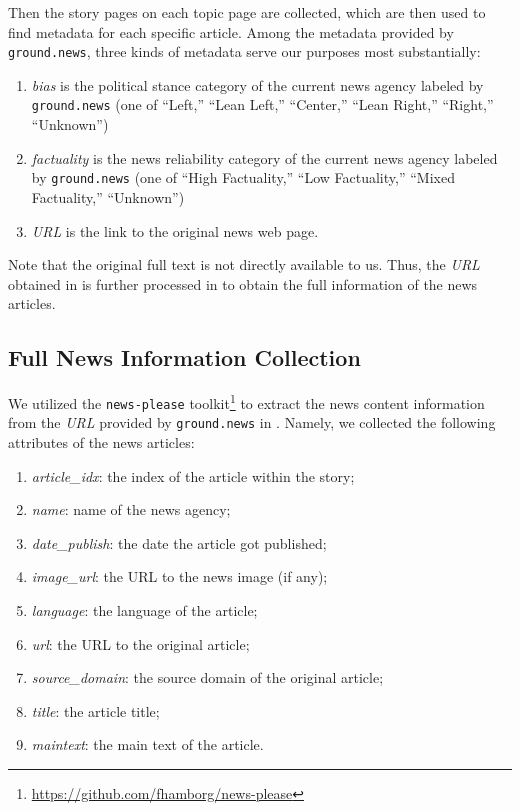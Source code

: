Then the story pages on each topic page are collected, which are then used to find metadata for each specific article. 
Among the metadata provided by \texttt{ground.news}, three kinds of metadata serve our purposes most substantially:
\begin{enumerate}
    \item \textit{bias} is the political stance category of the current news agency labeled by \texttt{ground.news} (one of ``Left,'' ``Lean Left,'' ``Center,'' ``Lean Right,'' ``Right,'' ``Unknown'')
    \item \textit{factuality} is the news reliability category of the current news agency labeled by \texttt{ground.news} (one of ``High Factuality,'' ``Low Factuality,'' ``Mixed Factuality,'' ``Unknown'')
    \item \textit{URL} is the link to the original news web page.
\end{enumerate}

Note that the original full text is not directly available to us. Thus, the \textit{URL} obtained in  is further processed in  to obtain the full information of the news articles.


\subsection{Full News Information Collection}
\label{full-news}
We utilized the \texttt{news-please} toolkit\footnote{\url{https://github.com/fhamborg/news-please}} to extract the news content information from the \textit{URL} provided by \texttt{ground.news} in . Namely, we collected the following attributes of the news articles:
\begin{enumerate}
    \item \textit{article\_idx}: the index of the article within the story;
    \item \textit{name}: name of the news agency;
    \item \textit{date\_publish}: the date the article got published;
    \item \textit{image\_url}: the URL to the news image (if any);
    \item \textit{language}: the language of the article;
    \item \textit{url}: the URL to the original article;
    \item \textit{source\_domain}: the source domain of the original article;
    \item \textit{title}: the article title;
    \item \textit{maintext}: the main text of the article.
\end{enumerate}

